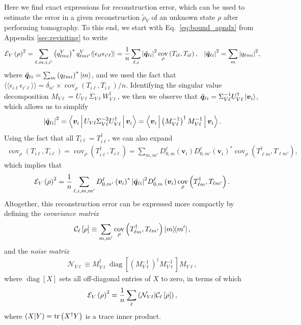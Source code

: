\documentclass[a4paper,twocolumn,unpublished]{quantumarticle}
\newcommand{\f}[2]{\dfrac{#1}{#2}} %
\newcommand{\p}[1]{\left(#1\right)} %
\renewcommand{\sp}[1]{\left[#1\right]} %
\newcommand{\bk}{\Braket} %
\newcommand{\bbk}[1]{\langle\!\langle #1 \rangle\!\rangle}
\newcommand{\C}{\mathcal{C}}
\newcommand{\E}{\mathcal{E}}
\newcommand{\N}{\mathcal{N}}
\def\obk#1{\mathinner{({#1})}}
\DeclareMathOperator{\cov}{cov}
\DeclareMathOperator{\diag}{diag}
\begin{document}
Here we find exact expressions for reconstruction error, which can be used to estimate the error in a given reconstruction $\tilde\rho_V$ of an unknown state $\rho$ after performing tomography.
To this end, we start with Eq.~\eqref{eq:bound_apndx} from Appendix \ref{sec:revisiting} to write
\begin{align}
  \E_V\p{\rho}^2
  = \sum_{\ell,m,i,i'} \p{q^V_{\ell mi}}^* q^V_{\ell mi'} \bbk{\epsilon_{i\ell}\epsilon_{i'\ell}}
  = \f1n \sum_{\ell,i} \abs{\tilde{\bm q}_{\ell i}}^2 \cov_\rho\p{T_{i\ell},T_{i\ell}},
  &&
  \abs{\tilde{\bm q}_{\ell i}}^2 = \sum_m \abs{q_{\ell mi}}^2,
  \label{eq:error_SM_start}
\end{align}
where $\tilde{\bm q}_{\ell i} = \sum_m \p{q_{\ell mi}}^* \ket{m}$, and we used the fact that $\bbk{\epsilon_{i\ell}\epsilon_{i'\ell}} = \delta_{ii'}\times\cov_\rho\p{T_{i\ell},T_{i\ell}}/n$.
Identifying the singular value decomposition $M_{V\ell} = U_{V\ell} \Sigma_{V\ell} W_{V\ell}^\dag$, we then we observe that $\tilde{\bm q}_{\ell i} = \Sigma_{V\ell}^{-1} U_{V\ell}^\dag \ket{\bm v_i}$, which allows us to simplify
\begin{align}
  \abs{\tilde{\bm q}_{\ell i}}^2
  = \bk{\bm v_i | U_{V\ell} \Sigma_{V\ell}^{-2} U_{V\ell}^\dag | \bm v_i}
  = \bk{\bm v_i| \p{M_{V\ell}^{-1}}^\dag M_{V\ell}^{-1} | \bm v_i}.
\end{align}
Using the fact that all $T_{i\ell}=T_{i\ell}^\dag$, we can also expand
\begin{align}
  \cov_\rho\p{T_{i\ell},T_{i\ell}}
  = \cov_\rho\p{T_{i\ell}^\dag,T_{i\ell}}
  = \sum_{m,m'} D^\ell_{0,m}\p{\bm v_i} D^\ell_{0,m'}\p{\bm v_i}^*
  \cov_\rho\p{T_{\ell m}^\dag, T_{\ell m'}},
\end{align}
which implies that
\begin{align}
  \E_V\p{\rho}^2
  = \f1n \sum_{\ell,i,m,m'}
  D^\ell_{0,m'}\p{\bm v_i}^* \abs{\tilde{\bm q}_{\ell i}}^2
  D^\ell_{0,m}\p{\bm v_i}
  \cov_\rho\p{T_{\ell m}^\dag, T_{\ell m'}}.
\end{align}
Altogether, this reconstruction error can be expressed more compactly by defining the {\it covariance matrix}
\begin{align}
  \C_\ell\sp{\rho} \equiv
  \sum_{m,m'} \cov_\rho\p{T_{\ell m}^\dag, T_{\ell m'}} \op{m}{m'},
\end{align}
and the {\it noise matrix}
\begin{align}
  \N_{V\ell} \equiv M_{V\ell}^\dag \diag\sp{\p{M_{V\ell}^{-1}}^\dag
    M_{V\ell}^{-1}} M_{V\ell},
\end{align}
where $\diag\sp{X}$ sets all off-diagonal entries of $X$ to zero, in terms of which
\begin{align}
  \E_V\p{\rho}^2 = \f1n \sum_\ell \obk{\N_{V\ell}|\C_\ell\sp{\rho}},
  \label{eq:error_SM_mid}
\end{align}
where $\obk{X|Y}=\tr\p{X^\dag Y}$ is a trace inner product.
\end{document}
